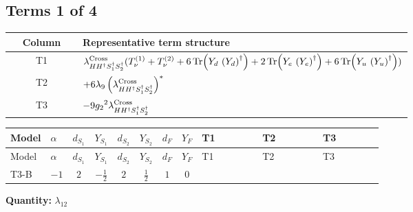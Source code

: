 \documentclass[8pt]{article}
\begin{document}
\begin{landscape}
\subsection*{Terms 1 of 4}
\begin{center}
\begin{tabular}{@{}c >{\raggedright\arraybackslash}p{0.82\linewidth}@{}}
\toprule
Column & Representative term structure \\
\midrule
T1 & \(\displaystyle {\lambda_{H H^\dagger S_1^\dagger S_2^\dagger}^{\rm Cross}} (T_{\nu}^{(1)}+T_{\nu}^{(2)}+6 \operatorname{Tr}\!\left({Y_d}\,\left({Y_d}\right)^{\dagger}\right)+2 \operatorname{Tr}\!\left({Y_e}\,\left({Y_e}\right)^{\dagger}\right)+6 \operatorname{Tr}\!\left({Y_u}\,\left({Y_u}\right)^{\dagger}\right))\) \\
\midrule
T2 & \(\displaystyle +6 {\lambda_{9}} \left({\lambda_{H H^\dagger S_1^\dagger S_2^\dagger}^{\rm Cross}}\right)^{*}\) \\
\midrule
T3 & \(\displaystyle -9 {g_2}^2 {\lambda_{H H^\dagger S_1^\dagger S_2^\dagger}^{\rm Cross}}\) \\
\midrule
\bottomrule
\end{tabular}
\end{center}
\smallskip
\tiny
\begin{longtable}{@{}llcccccc >{\raggedright\arraybackslash}p{0.21\linewidth} >{\raggedright\arraybackslash}p{0.21\linewidth} >{\raggedright\arraybackslash}p{0.21\linewidth}@{}}
\toprule
Model & $\alpha$ & $d_{S_1}$ & $Y_{S_1}$ & $d_{S_2}$ & $Y_{S_2}$ & $d_F$ & $Y_F$ & T1 & T2 & T3 \\
\midrule
\endfirsthead
\toprule
Model & $\alpha$ & $d_{S_1}$ & $Y_{S_1}$ & $d_{S_2}$ & $Y_{S_2}$ & $d_F$ & $Y_F$ & T1 & T2 & T3 \\
\midrule
\endhead
T3-B & $-1$ & $2$ & $-\frac{1}{2}$ & $2$ & $\frac{1}{2}$ & $1$ & $0$ & \scriptsize\adjustbox{max width=\linewidth}{$\begin{gathered} {\lambda_{H H^\dagger S_1^\dagger S_2^\dagger}^{\rm Cross}} (T_{\nu}^{(1)}+T_{\nu}^{(2)}+6 \operatorname{Tr}\!\left({Y_d}\,\left({Y_d}\right)^{\dagger}\right)+2 \operatorname{Tr}\!\left({Y_e}\,\left({Y_e}\right)^{\dagger}\right)+6 \operatorname{Tr}\!\left({Y_u}\,\left({Y_u}\right)^{\dagger}\right))\end{gathered}$} & \scriptsize\adjustbox{max width=\linewidth}{$\begin{gathered} +6 {\lambda_{9}} \left({\lambda_{H H^\dagger S_1^\dagger S_2^\dagger}^{\rm Cross}}\right)^{*}\end{gathered}$} & \scriptsize\adjustbox{max width=\linewidth}{$\begin{gathered} -9 {g_2}^2 {\lambda_{H H^\dagger S_1^\dagger S_2^\dagger}^{\rm Cross}}\end{gathered}$} \\
\midrule
\bottomrule
\end{longtable}
\clearpage
\noindent\textbf{Quantity: }$\lambda_{12}$\par\smallskip

\end{landscape}
\end{document}
